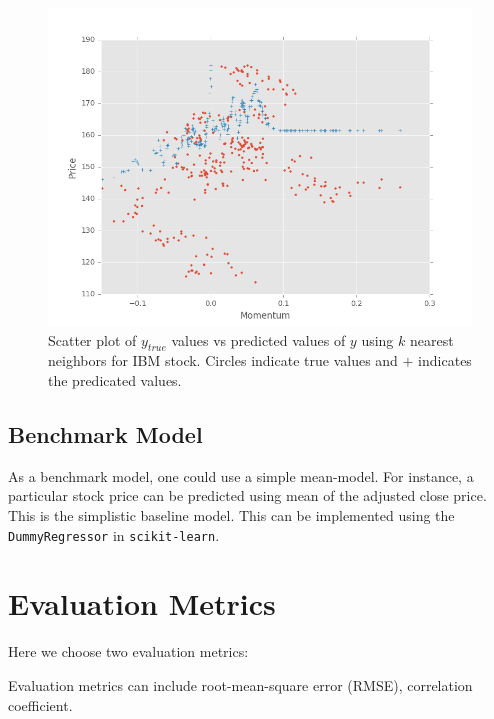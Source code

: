 \documentclass[12pt]{article}
\begin{document}
\begin{itemize}
\begin{figure}[!htbp]
\begin{center}
\includegraphics[height=0.4\textheight,width=\textwidth]{knn_momentum_fit.png}
\caption{Scatter plot of $y_{true}$ values vs predicted values of $y$ using $k$ nearest neighbors for IBM stock. Circles indicate true values and $+$ indicates the predicated values. }
\label{fig:knn_example}
\end{center}
\end{figure}


\subsection{Benchmark Model}
\label{sec:bench}
As a benchmark model, one could use a simple mean-model. For instance, a particular stock price can be predicted using mean of the adjusted close price. This  is the simplistic baseline model. This can be implemented using the \texttt{DummyRegressor} \cite{scikit-dummy} in \texttt{scikit-learn}.



\section{Evaluation Metrics}
\label{sec:metrics}

Here we choose two evaluation metrics:

Evaluation metrics can include root-mean-square error (RMSE), correlation coefficient. 

\begin{itemize}


\end{itemize}
\end{itemize}
\end{document}
